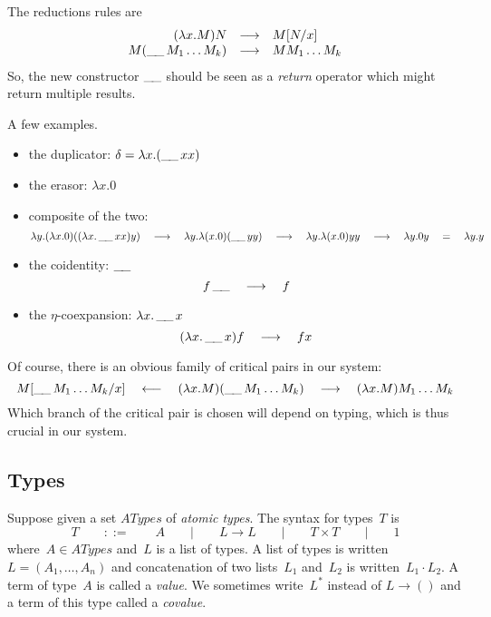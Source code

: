 \documentclass[a4paper,titlepage]{article}
\newcommand{\ATypes}{ATypes}
\newcommand{\hole}{\mathop{\_\hspace{-.3ex}\_}}
\begin{document}
The reductions rules are
\[
\begin{array}{r@{\quad}c@{\quad}l}
  (\lambda x.M)N&\longrightarrow&M[N/x]\\
  M(\hole M_1\ldots M_k)&\longrightarrow&MM_1\ldots M_k\\
\end{array}
\]
So, the new constructor $\hole$ should be seen as a \emph{return} operator which
might return multiple results.

A few examples.
\begin{itemize}
\item the duplicator: $\delta=\lambda x.(\hole xx)$
\item the erasor: $\lambda x.0$
\item composite of the two:
  \[
  \lambda y.(\lambda x.0)((\lambda x.\hole xx)y)
  \quad\longrightarrow\quad
  \lambda y.\lambda(x.0)(\hole yy)
  \quad\longrightarrow\quad
  \lambda y.\lambda(x.0)yy
  \quad\longrightarrow\quad
  \lambda y.0y
  \quad=\quad
  \lambda y.y
  \]
\item the coidentity: $\hole$
  \[
  f\hole\quad\longrightarrow\quad f
  \]
\item the $\eta$-coexpansion: $\lambda x.\hole x$
  \[
  (\lambda x.\hole x)f\quad\longrightarrow\quad fx
  \]
\end{itemize}
Of course, there is an obvious family of critical pairs in our system:
\[
M[\hole M_1\ldots M_k/x]
\quad\longleftarrow\quad
(\lambda x.M)(\hole M_1\ldots M_k)
\quad\longrightarrow\quad
(\lambda x.M)M_1\ldots M_k
\]
Which branch of the critical pair is chosen will depend on typing, which is thus
crucial in our system.

\subsection{Types}
Suppose given a set $\ATypes$ of \emph{atomic types}. The syntax for types~$T$ is
\[
T
\qquad::=\qquad
A
\qquad|\qquad
L\to L
\qquad|\qquad
T \times T
\qquad|\qquad
1
\]
where~$A\in\ATypes$ and~$L$ is a list of types. A list of types is written
\hbox{$L=(A_1,\ldots,A_n)$} and concatenation of two lists~$L_1$ and~$L_2$ is
written~$L_1\cdot L_2$. A term of type~$A$ is called a \emph{value}. We
sometimes write~$L^*$ instead of $L\to()$ and a term of this type called a
\emph{covalue}.
\end{document}
